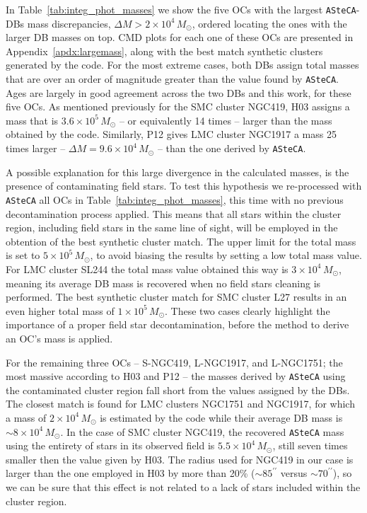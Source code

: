 \documentclass{aa}
\begin{document}
%
In Table~\ref{tab:integ_phot_masses} we show the five OCs with the largest
\texttt{ASteCA}-DBs mass discrepancies, $\Delta M{>}2{\times}10^4\,M_{\odot}$,
ordered locating the ones with the larger DB masses on top.
CMD plots for each one of these OCs are presented in
Appendix~\ref{apdx:largemass}, along with the best match synthetic clusters
generated by the code.
For the most extreme cases, both DBs assign total masses that are over an order
of magnitude greater than the value found by \texttt{ASteCA}.
Ages are largely in good agreement across the two DBs and this work, for these
five OCs.
As mentioned previously for the SMC cluster NGC419, H03 assigns a mass that is
$3.6{\times}10^5\,M_{\odot}$ -- or equivalently 14 times -- larger than the mass
obtained by the code. Similarly, P12 gives LMC cluster NGC1917 a mass 25
times larger -- $\Delta M{=}9.6{\times}10^4\,M_{\odot}$ -- than the one
derived by \texttt{ASteCA}.

A possible explanation for this large divergence in the calculated masses, is
the presence of contaminating field stars.
To test this hypothesis we re-processed with \texttt{ASteCA} all OCs in
Table~\ref{tab:integ_phot_masses}, this time with no previous decontamination
process applied. This means that all stars within the cluster region, including
field stars in the same line of sight, will be employed in the obtention of 
the best synthetic cluster match. The upper limit for the total mass is set to
$5{\times}10^5\,M_{\odot}$, to avoid biasing the results by setting a low total
mass value.
%
For LMC cluster SL244 the total mass value obtained this way is
$3{\times}10^4\,M_{\odot}$, meaning its average DB mass is recovered when no
field stars cleaning is performed.
The best synthetic cluster match for SMC cluster L27 results in an even higher
total mass of $1{\times}10^5\,M_{\odot}$. These two cases clearly highlight the
importance of a proper field star decontamination, before the method to derive an
OC's mass is applied.

For the remaining three OCs -- S-NGC419, L-NGC1917, and L-NGC1751; the most
massive according to H03 and P12 -- the masses derived by \texttt{ASteCA} using
the contaminated cluster region fall short from the values assigned by the DBs.
The closest match is found for LMC clusters NGC1751 and NGC1917, for which a
mass of $2{\times}10^4\,M_{\odot}$ is estimated by the code while their average DB
mass is ${\sim}8{\times}10^4\,M_{\odot}$.
In the case of SMC cluster NGC419, the recovered \texttt{ASteCA} mass using the
entirety of stars in its observed field is $5.5{\times}10^4\,M_{\odot}$, still
seven times smaller then the value given by H03. The radius used for NGC419 in
our case is larger than the one employed in H03 by more than 20\%
(${\sim}85^{\prime\prime}$ versus ${\sim}70^{\prime\prime}$), so we can be sure
that this effect is not related to a lack of stars included within the cluster
region.
\end{document}
